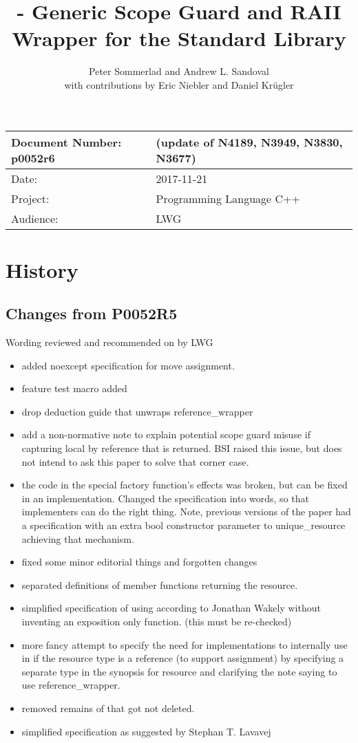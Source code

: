 \documentclass[ebook,11pt,article]{memoir}
\title{\papernumber{} - Generic Scope Guard and RAII Wrapper for the Standard Library}
\author{Peter Sommerlad and Andrew L. Sandoval\\with contributions by Eric Niebler and Daniel Kr\"ugler}
\date{\paperdate}                        %
\newcommand{\papernumber}{p0052r6}
\newcommand{\paperdate}{2017-11-21}
\begin{document}
\maketitle
\begin{tabular}[t]{|l|l|}\hline 
Document Number: \papernumber &   (update of N4189, N3949, N3830, N3677)\\\hline
Date: & \paperdate \\\hline
Project: & Programming Language C++\\\hline 
Audience: & LWG\\\hline
\end{tabular}

\chapter{History}
\section{Changes from P0052R5}
Wording reviewed and recommended on by LWG
\begin{itemize}
\item added noexcept specification for move assignment.
\item feature test macro added 
\item drop  deduction guide that unwraps reference_wrapper
\item add a non-normative note to explain potential scope guard misuse if capturing local by reference that is returned. BSI raised this issue, but does not intend to ask this paper to solve that corner case.
\item the code in the special factory function's effects was broken, but can be fixed in an implementation. Changed the specification into words, so that implementers can do the right thing. Note, previous versions of the paper had a specification with an extra bool constructor parameter to unique_resource achieving that mechanism.
\item fixed some minor editorial things and forgotten changes
\item separated definitions of  member functions returning the resource.
\item simplified specification of  using  according to Jonathan Wakely without inventing an exposition only function. (this must be re-checked)
\item more fancy attempt to specify the need for implementations to internally use  in  if the resource type is a reference (to support assignment) by specifying a separate type in the  synopsis for resource and clarifying the note saying to use reference_wrapper.
\item removed remains of  that got not deleted.
\item simplified  specification as suggested by Stephan T. Lavavej
\end{itemize}
\end{document}
